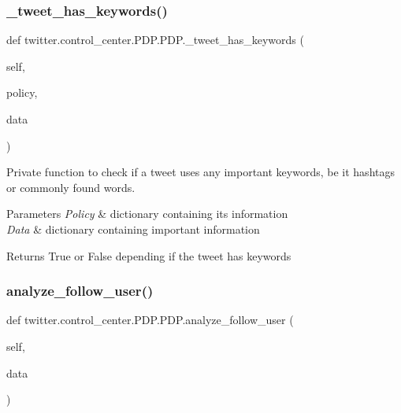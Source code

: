 \subsubsection{\texorpdfstring{\+\_\+tweet\+\_\+has\+\_\+keywords()}{\_tweet\_has\_keywords()}}
{\footnotesize\ttfamily def twitter.\+control\+\_\+center.\+P\+D\+P.\+P\+D\+P.\+\_\+tweet\+\_\+has\+\_\+keywords (\begin{DoxyParamCaption}\item[{}]{self,  }\item[{}]{policy,  }\item[{}]{data }\end{DoxyParamCaption})\hspace{0.3cm}{\ttfamily [private]}}



Private function to check if a tweet uses any important keywords, be it hashtags or commonly found words. 


\begin{DoxyParams}{Parameters}
{\em Policy} & dictionary containing its information \\
\hline
{\em Data} & dictionary containing important information\\
\hline
\end{DoxyParams}
\begin{DoxyReturn}{Returns}
True or False depending if the tweet has keywords 
\end{DoxyReturn}
\mbox{\label{classtwitter_1_1control__center_1_1PDP_1_1PDP_ab9d69b04d93fc8b6fead61fd98991c22}} 
\subsubsection{\texorpdfstring{analyze\+\_\+follow\+\_\+user()}{analyze\_follow\_user()}}
{\footnotesize\ttfamily def twitter.\+control\+\_\+center.\+P\+D\+P.\+P\+D\+P.\+analyze\+\_\+follow\+\_\+user (\begin{DoxyParamCaption}\item[{}]{self,  }\item[{}]{data }\end{DoxyParamCaption})}



